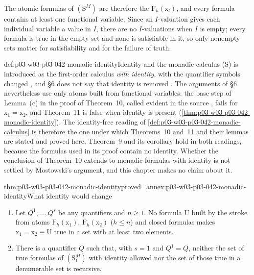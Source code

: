 The atomic formulas of \((\mathrm S^M)\) are therefore the
\(\mathrm F_h(\mathrm x_l)\), and every formula contains at least one
functional variable.  Since an \(I\)-valuation gives each individual
variable a value in \(I\), there are no \(I\)-valuations when \(I\) is
empty; every formula is true in the empty set and none is satisfiable in
it, so only nonempty sets matter for satisfiability and for the failure of
truth.

\begin{hbwarning}{def:p03-w03-p03-042-monadic-identity}{Identity and the monadic calculus}
(S) is introduced as the first-order calculus \emph{with identity}, with
the quantifier symbols changed \cite[p.~15]{Mostowski1957}, and \S6 does
not say that identity is removed \cite[p.~28]{Mostowski1957}.  The
arguments of \S6 nevertheless use only atoms built from functional
variables: the base step of Lemma~(c) in the proof of Theorem~10, called
evident in the source \cite[p.~30]{Mostowski1957}, fails for
\(\mathrm x_1=\mathrm x_2\), and Theorem~11 is false when identity is
present (\cref{thm:p03-w03-p03-042-monadic-identity}).  The identity-free
reading of \cref{def:p03-w03-p03-042-monadic-calculus} is therefore the
one under which Theorems~10 and~11 and their lemmas are stated and proved
here.  Theorem~9 and its corollary hold in both readings, because the
formulas used in its proof contain no identity.  Whether the conclusion of
Theorem~10 extends to monadic formulas with identity is not settled by
Mostowski's argument, and this chapter makes no claim about it.
\end{hbwarning}

\begin{hblemma}{thm:p03-w03-p03-042-monadic-identity}{proved=annex:p03-w03-p03-042-monadic-identity}{What identity would change}
\begin{enumerate}
\item Let \(Q^1,\ldots,Q^s\) be any quantifiers and \(n\geq1\).  No formula
      \(\mathrm U\) built by the stroke from atoms
      \(\mathrm F_h(\mathrm x_1)\), \(\mathrm F_h(\mathrm x_2)\)
      (\(h\leq n\)) and closed formulas makes \(\mathrm x_1=\mathrm
      x_2\equiv\mathrm U\) true in a set with at least two elements.
\item There is a quantifier \(Q\) such that, with \(s=1\) and
      \(Q^1=Q\), neither the set of true formulas of \((\mathrm S^M_1)\)
      with identity allowed nor the set of those true in a denumerable set
      is recursive.
\end{enumerate}
\end{hblemma}

